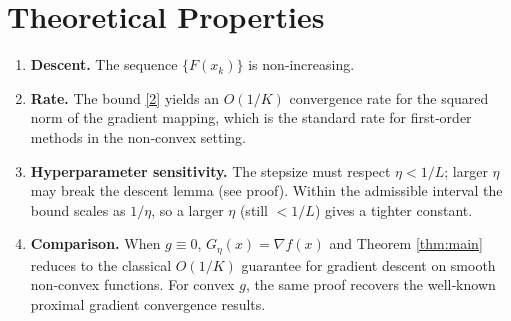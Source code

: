 \documentclass{article}
\newcommand{\grad}{\nabla}
\begin{document}
\section*{Theoretical Properties}
\begin{enumerate}[label=\arabic*.]
\item \textbf{Descent.} The sequence $\{F(x_{k})\}$ is non‑increasing.
\item \textbf{Rate.} The bound \eqref{2} yields an $O(1/K)$ convergence rate for the squared norm of the gradient mapping, which is the standard rate for first‑order methods in the non‑convex setting.
\item \textbf{Hyperparameter sensitivity.} The stepsize must respect $\eta<1/L$; larger $\eta$ may break the descent lemma (see proof). Within the admissible interval the bound scales as $1/\eta$, so a larger $\eta$ (still $<1/L$) gives a tighter constant.
\item \textbf{Comparison.} When $g\equiv0$, $G_{\eta}(x)=\grad f(x)$ and Theorem \ref{thm:main} reduces to the classical $O(1/K)$ guarantee for gradient descent on smooth non‑convex functions. For convex $g$, the same proof recovers the well‑known proximal gradient convergence results.
\end{enumerate}
\end{document}
